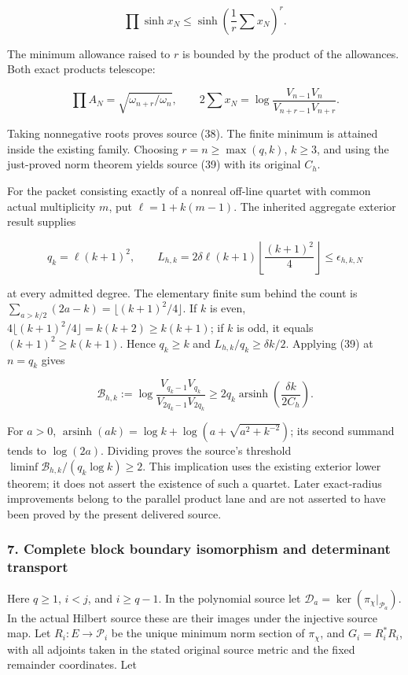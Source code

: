 \[
\prod\sinh x_N\le\sinh\left(\frac1r\sum x_N\right)^r.
\]

The minimum allowance raised to \(r\) is bounded by the product of the allowances. Both exact products telescope:

\[
\prod A_N=\sqrt{\omega_{n+r}/\omega_n},\qquad
2\sum x_N=\log\frac{V_{n-1}V_n}{V_{n+r-1}V_{n+r}}.
\]

Taking nonnegative roots proves source (38). The finite minimum is attained inside the existing family. Choosing \(r=n\ge\max(q,k)\), \(k\ge3\), and using the just-proved norm theorem yields source (39) with its original \(C_h\).

For the packet consisting exactly of a nonreal off-line quartet with common actual multiplicity \(m\), put \(\ell=1+k(m-1)\). The inherited aggregate exterior result supplies

\[
q_k=\ell(k+1)^2,\qquad
L_{h,k}=2\delta\ell(k+1)\left\lfloor\frac{(k+1)^2}{4}\right\rfloor
\le\epsilon_{h,k,N}
\]

at every admitted degree. The elementary finite sum behind the count is \(\sum_{a>k/2}(2a-k)=\lfloor(k+1)^2/4\rfloor\). If \(k\) is even, \(4\lfloor(k+1)^2/4\rfloor=k(k+2)\ge k(k+1)\); if \(k\) is odd, it equals \((k+1)^2\ge k(k+1)\). Hence \(q_k\ge k\) and \(L_{h,k}/q_k\ge\delta k/2\). Applying (39) at \(n=q_k\) gives

\[
\mathcal B_{h,k}:=\log\frac{V_{q_k-1}V_{q_k}}{V_{2q_k-1}V_{2q_k}}
\ge2q_k\operatorname{arsinh}\left(\frac{\delta k}{2C_h}\right).
\]

For \(a>0\), \(\operatorname{arsinh}(ak)=\log k+\log(a+\sqrt{a^2+k^{-2}})\); its second summand tends to \(\log(2a)\). Dividing proves the source's threshold \(\liminf\mathcal B_{h,k}/(q_k\log k)\ge2\). This implication uses the existing exterior lower theorem; it does not assert the existence of such a quartet. Later exact-radius improvements belong to the parallel product lane and are not asserted to have been proved by the present delivered source.

\subsubsection{7. Complete block boundary isomorphism and determinant transport}\label{endpoint-arithmetic_intake--complete-block-boundary-isomorphism-and-determinant-transport}

Here \(q\ge1\), \(i<j\), and \(i\ge q-1\). In the polynomial source let \(\mathcal D_a=\ker(\pi_\chi|_{\mathcal P_a})\). In the actual Hilbert source these are their images under the injective source map. Let \(R_i:E\to\mathcal P_i\) be the unique minimum norm section of \(\pi_\chi\), and \(G_i=R_i^*R_i\), with all adjoints taken in the stated original source metric and the fixed remainder coordinates. Let

